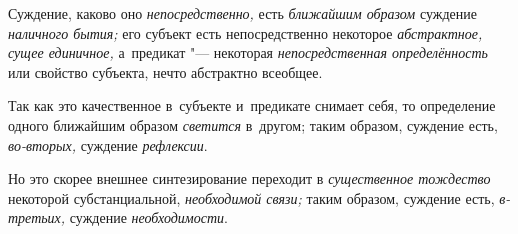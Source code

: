 Суждение, каково оно {\em непосредственно,} есть {\em ближайшим образом}
суждение {\em наличного бытия;} его субъект есть непосредственно некоторое
{\em абстрактное, сущее единичное,} а~предикат "--- некоторая
{\em непосредственная определённость} или свойство субъекта, нечто
абстрактно всеобщее.

Так как это качественное в~субъекте и~предикате снимает себя,
то определение одного ближайшим образом {\em светится} в~другом;
таким образом, суждение есть, {\em во-вторых,} суждение {\em рефлексии}.

Но это скорее внешнее синтезирование
переходит в {\em существенное тождество} некоторой субстанциальной,
{\em необходимой связи;} таким образом, суждение есть, {\em в-третьих,}
суждение {\em необходимости}.

